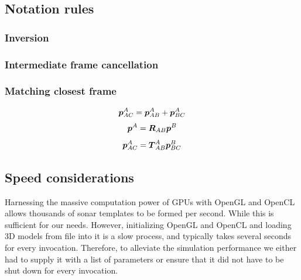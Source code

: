\subsection{Notation rules}

\subsubsection{Inversion}


\subsubsection{Intermediate frame cancellation}



\subsubsection{Matching closest frame}

$$\boldsymbol{p}_{AC}^A = \boldsymbol{p}_{AB}^A + \boldsymbol{p}_{BC}^A$$
$$\boldsymbol{p}^A = \boldsymbol{R}_{AB} \boldsymbol{p}^B$$
$$\boldsymbol{p}_{AC}^A = \boldsymbol{T}_{AB}^A \boldsymbol{p}_{BC}^B$$


\subsection{Speed considerations}

Harnessing the massive computation power of GPUs with OpenGL and OpenCL allows thousands of sonar templates to be formed per second. While this is sufficient for our needs. However, initializing OpenGL and OpenCL and loading 3D models from file into it is a slow process, and typically takes several seconds for every invocation. Therefore, to alleviate the simulation performance we either had to supply it with a list of parameters or ensure that it did not have to be shut down for every invocation. 



